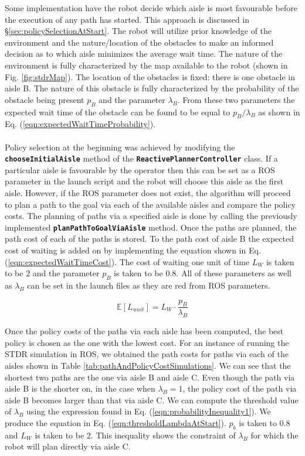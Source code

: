 \documentclass[a4paper,12pt]{article}
\begin{document}
			Some implementation have the robot decide which aisle is most favourable before the execution of any path has started. This approach is discussed in \S \ref{sec:policySelectionAtStart}. The robot will utilize prior knowledge of the environment and the nature/location of the obstacles to make an informed decision as to which aisle minimizes the average wait time. The nature of the environment is fully characterized by the map available to the robot (shown in Fig. \ref{fig:stdrMap}). The location of the obstacles is fixed: there is one obstacle in aisle B. The nature of this obstacle is fully characterized by the probability of the obstacle being present $p_B$ and the parameter $\lambda_B$. From these two parameters the expected wait time of the obstacle can be found to be equal to $p_B/\lambda_B$ as shown in Eq. (\ref{eqn:expectedWaitTimeProbability}).
			\\
			\\
			Policy selection at the beginning was achieved by modifying the \textbf{\texttt{chooseInitialAisle}} method of the \textbf{\texttt{ReactivePlannerController}} class. If a particular aisle is favourable by the operator then this can be set as a ROS parameter in the launch script and the robot will choose this aisle as the first aisle. However, if the ROS parameter does not exist, the algorithm will proceed to plan a path to the goal via each of the available aisles and compare the policy costs. The planning of paths via a specified aisle is done by calling the previously implemented \texttt{\textbf{planPathToGoalViaAisle}} method. Once the paths are planned, the path cost of each of the paths is stored. To the path cost of aisle B the expected cost of waiting is added on by implementing the equation shown in Eq. (\ref{eqn:expectedWaitTimeCost}). The cost of waiting one unit of time $L_W$ is taken to be $2$ and the parameter $p_B$ is taken to be $0.8$. All of these parameters as well as $\lambda_B$ can be set in the launch files as they are red from ROS parameters.
			
			\begin{equation}
				\mathbb{E}[L_{wait}]=L_W \cdot \frac{p_B}{\lambda_B}
			\label{eqn:expectedWaitTimeCost}
			\end{equation}
			
			Once the policy costs of the paths via each aisle has been computed, the best policy is chosen as the one with the lowest cost. For an instance of running the STDR simulation in ROS, we obtained the path costs for paths via each of the aisles shown in Table \ref{tab:pathAndPolicyCostSimulations}. We can see that the shortest two paths are the one via aisle B and aisle C. Even though the path via aisle B is the shorter on, in the case when $\lambda_B=1$, the policy cost of the path via aisle B becomes larger than that via aisle C. We can compute the threshold value of $\lambda_B$ using the expression found in Eq. (\ref{eqn:probabilityInequality1}). We produce the equation in Eq. (\ref{eqn:thresholdLambdaAtStart}). $p_b$ is taken to $0.8$ and $L_W$ is taken to be $2$. This inequality shows the constraint of $\lambda_B$ for which the robot will plan directly via aisle C.
			
\end{document}
